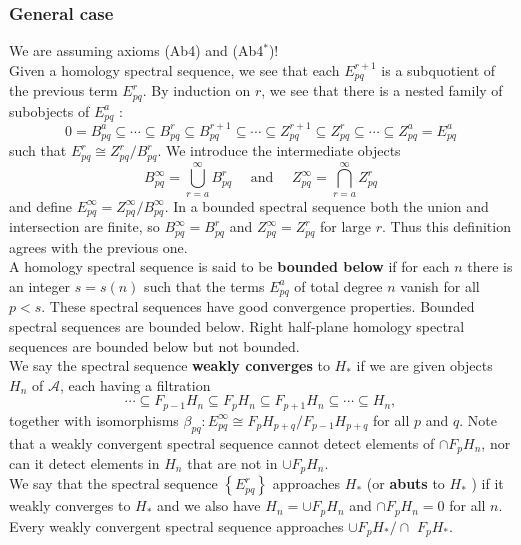 \subsubsection{General case}

We are assuming axioms (Ab4) and (Ab4$^*$)!\\

Given a homology spectral sequence, we see that each $E_{p q}^{r+1}$ is a subquotient of the previous term $E_{p q}^r$. By induction on $r$, we see that there is a nested family of subobjects of $E_{p q}^a$ :
$$
0=B_{p q}^a \subseteq \cdots \subseteq B_{p q}^r \subseteq B_{p q}^{r+1} \subseteq \cdots \subseteq Z_{p q}^{r+1} \subseteq Z_{p q}^r \subseteq \cdots \subseteq Z_{p q}^a=E_{p q}^a
$$
such that $E_{p q}^r \cong Z_{p q}^r / B_{p q}^r$. We introduce the intermediate objects
$$
B_{p q}^{\infty}=\bigcup_{r=a}^{\infty} B_{p q}^r \quad \text { and } \quad Z_{p q}^{\infty}=\bigcap_{r=a}^{\infty} Z_{p q}^r
$$
and define $E_{p q}^{\infty}=Z_{p q}^{\infty} / B_{p q}^{\infty}$. In a bounded spectral sequence both the union and intersection are finite, so $B_{p q}^{\infty}=B_{p q}^r$ and $Z_{p q}^{\infty}=Z_{p q}^r$ for large $r$. Thus this definition agrees with the previous one.\\
A homology spectral sequence is said to be \textbf{bounded below }if for each $n$ there is an integer $s=s(n)$ such that the terms $E_{p q}^a$ of total degree $n$ vanish for all $p<s$. These spectral sequences have good convergence properties. Bounded spectral sequences are bounded below. Right half-plane homology spectral sequences are bounded below but not bounded.\\

We say the spectral sequence \textbf{weakly converges} to $H_*$ if we are given objects $H_n$ of $\mathcal{A}$, each having a filtration
$$
\cdots \subseteq F_{p-1} H_n \subseteq F_p H_n \subseteq F_{p+1} H_n \subseteq \cdots \subseteq H_n,
$$
together with isomorphisms $\beta_{p q}: E_{p q}^{\infty} \cong F_p H_{p+q} / F_{p-1} H_{p+q}$ for all $p$ and $q$. Note that a weakly convergent spectral sequence cannot detect elements of $\cap F_p H_n$, nor can it detect elements in $H_n$ that are not in $\cup F_p H_n$.\\
We say that the spectral sequence $\left\{E_{p q}^r\right\}$ approaches $H_*$ (or \textbf{abuts} to $H_*$ ) if it weakly converges to $H_*$ and we also have $H_n=\cup F_p H_n$ and $\cap F_p H_n=0$ for all $n$. Every weakly convergent spectral sequence approaches $\cup F_p H_* / \cap$ $F_p H_*$.\\

